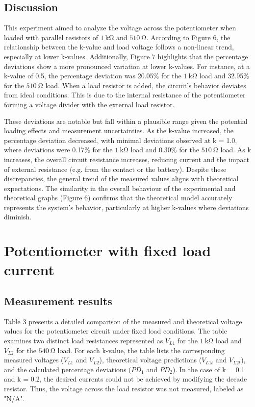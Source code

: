 \documentclass[a4paper]{article}
\newcommand{\unit}[1]{~\mathrm{#1}}
\begin{document}
\subsection{Discussion}
This experiment aimed to analyze the voltage across the potentiometer when loaded with parallel resistors 
of $1 \unit{k\Omega}$ and $510\unit{\Omega}$. 
According to Figure 6, the relationship between the k-value and load voltage follows a non-linear trend, 
especially at lower k-values. Additionally, Figure 7 highlights that the percentage deviations show a more 
pronounced variation at lower k-values. For instance, at a k-value of 0.5, the percentage deviation was 20.05\%
for the $1 \unit{k\Omega}$ load and 32.95\% for the $510\unit{\Omega}$ load. 
When a load resistor is added, the circuit's behavior deviates from ideal conditions. 
This is due to the internal resistance of the potentiometer forming a voltage divider with the external load resistor.

These deviations are notable but fall within a plausible range given the potential loading effects and measurement uncertainties. 
As the k-value increased, the percentage deviation decreased, with minimal deviations observed at k = 1.0, 
where deviations were 0.17\% for the $1 \unit{k\Omega}$ load and 0.30\% for the $510\unit{\Omega}$ load.
As k increases, the overall circuit resistance increases, reducing current and the impact of external resistance (e.g. from the contact or the battery).
Despite these discrepancies, the general trend of the measured values aligns with theoretical expectations. 
The similarity in the overall behaviour of the experimental and theoretical graphs (Figure 6) 
confirms that the theoretical model accurately represents the system's behavior, 
particularly at higher k-values where deviations diminish.

\section{Potentiometer with fixed load current}
\subsection{Measurement results}
Table 3 presents a detailed comparison of the measured and theoretical voltage values
for the potentiometer circuit under fixed load conditions. 
The table examines two distinct load resistances represented as $V_{L1}$ for the $1 \unit{k\Omega}$ load and $V_{L2}$ for the $540 \unit{\Omega}$ load. 
For each k-value, the table lists the corresponding measured voltages ($V_{L1}$ and $V_{L2}$), theoretical voltage predictions ($V_{L1t}$ and $V_{L2t}$), 
and the calculated percentage deviations ($PD_1$ and $PD_2$).
In the case of k = 0.1 and k = 0.2, the desired currents could not be achieved by modifying the decade resistor.
Thus, the voltage across the load resistor was not measured, labeled as "N/A".
\end{document}
